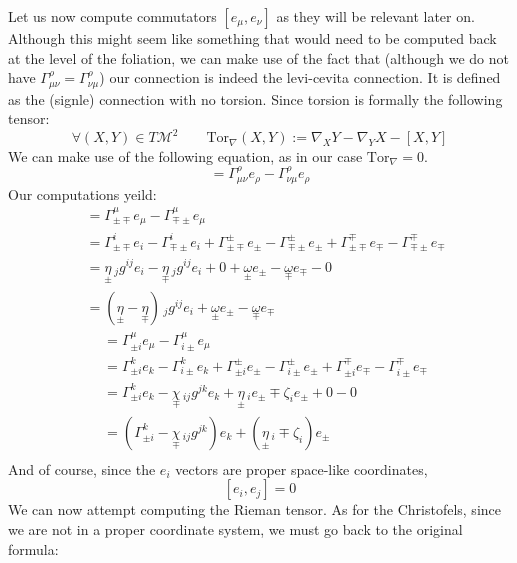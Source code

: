 \documentclass[a4paper,11pt]{article}
\numberwithin{equation}{section}
\theoremstyle{definition}
\begin{document}
Let us now compute commutators $[e_\mu,e_\nu]$ as they will be relevant later on. Although this might seem like something that would need to be computed back at the level of the foliation, we can make use of the fact that (although we do not have $\Gamma_{\mu\nu}^\rho=\Gamma_{\nu\mu}^\rho$) our connection is indeed the levi-cevita connection. It is defined as the (signle) connection with no torsion. Since torsion is formally the following tensor:
\begin{equation}
\forall (X,Y) \in T\mathcal{M}^2 \quad\quad  \mathrm{Tor}_\nabla(X,Y):= \nabla_XY-\nabla_YX-[X,Y]
\end{equation}
We can make use of the following equation, as in our case $\mathrm{Tor}_\nabla=0$.
\begin{equation}
    [e_\mu,e_\nu]=\Gamma_{\mu\nu}^\rho e_\rho-\Gamma_{\nu\mu}^\rho e_\rho
\end{equation}
Our computations yeild:
\begin{align*}
    [e_\pm,e_\mp]&=\Gamma_{\pm\mp}^\mu e_\mu - \Gamma_{\mp\pm}^\mu e_\mu\\
    &=\Gamma_{\pm\mp}^i e_i - \Gamma_{\mp\pm}^i e_i + \Gamma_{\pm\mp}^\pm e_\pm - \Gamma_{\mp\pm}^\pm e_\pm + \Gamma_{\pm\mp}^\mp e_\mp - \Gamma_{\mp\pm}^\mp e_\mp\\
    &=\underset{\pm}{\eta}\,_jg^{ij} e_i - \underset{\mp}{\eta}\,_jg^{ij} e_i + 0 + \underset{\pm}{\omega} e_\pm - \underset{\mp}{\omega} e_\mp - 0\\
    &=(\underset{\pm}{\eta}-\underset{\mp}{\eta})\,_jg^{ij} e_i+ \underset{\pm}{\omega} e_\pm - \underset{\mp}{\omega} e_\mp
\end{align*}
\begin{align*}
    [e_\pm,e_i]&=\Gamma_{\pm i}^\mu e_\mu - \Gamma_{i\pm}^\mu e_\mu\\
    &=\Gamma_{\pm i}^k e_k - \Gamma_{i\pm}^k e_k + \Gamma_{\pm i}^\pm e_\pm - \Gamma_{i\pm}^\pm e_\pm + \Gamma_{\pm i}^\mp e_\mp - \Gamma_{i\pm}^\mp e_\mp\\
    &=\Gamma_{\pm i}^k e_k - \underset{\mp}{\chi}\,_{ij}g^{jk} e_k + \underset{\pm}{\eta}\,_i e_\pm \mp \zeta_i e_\pm + 0 - 0\\
    &=(\Gamma_{\pm i}^k - \underset{\mp}{\chi}\,_{ij}g^{jk}) e_k + (\underset{\pm}{\eta}\,_i \mp \zeta_i) e_\pm\\
\end{align*}
And of course, since the $e_i$ vectors are proper space-like coordinates, 
$$[e_i,e_j]=0$$
We can now attempt computing the Rieman tensor. As for the Christofels, since we are not in a proper coordinate system, we must go back to the original formula:
\end{document}
